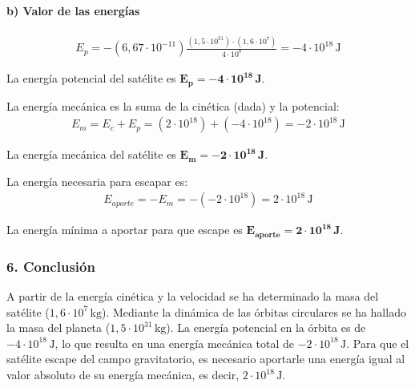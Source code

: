 \paragraph*{b) Valor de las energías}
\begin{gather}
    E_p = -(6,67 \cdot 10^{-11}) \frac{(1,5 \cdot 10^{31}) \cdot (1,6 \cdot 10^7)}{4 \cdot 10^8} = -4 \cdot 10^{18} \, \text{J}
\end{gather}
\begin{cajaresultado}
    La energía potencial del satélite es $\boldsymbol{E_p = -4 \cdot 10^{18} \, \textbf{J}}$.
\end{cajaresultado}
\medskip
La energía mecánica es la suma de la cinética (dada) y la potencial:
\begin{gather}
    E_m = E_c + E_p = (2 \cdot 10^{18}) + (-4 \cdot 10^{18}) = -2 \cdot 10^{18} \, \text{J}
\end{gather}
\begin{cajaresultado}
    La energía mecánica del satélite es $\boldsymbol{E_m = -2 \cdot 10^{18} \, \textbf{J}}$.
\end{cajaresultado}
\medskip
La energía necesaria para escapar es:
\begin{gather}
    E_{aporte} = -E_m = -(-2 \cdot 10^{18}) = 2 \cdot 10^{18} \, \text{J}
\end{gather}
\begin{cajaresultado}
    La energía mínima a aportar para que escape es $\boldsymbol{E_{aporte} = 2 \cdot 10^{18} \, \textbf{J}}$.
\end{cajaresultado}

\subsubsection*{6. Conclusión}
\begin{cajaconclusion}
    A partir de la energía cinética y la velocidad se ha determinado la masa del satélite ($1,6 \cdot 10^7 \, \text{kg}$). Mediante la dinámica de las órbitas circulares se ha hallado la masa del planeta ($1,5 \cdot 10^{31} \, \text{kg}$). La energía potencial en la órbita es de $-4 \cdot 10^{18} \, \text{J}$, lo que resulta en una energía mecánica total de $-2 \cdot 10^{18} \, \text{J}$. Para que el satélite escape del campo gravitatorio, es necesario aportarle una energía igual al valor absoluto de su energía mecánica, es decir, $2 \cdot 10^{18} \, \text{J}$.
\end{cajaconclusion}

\newpage
